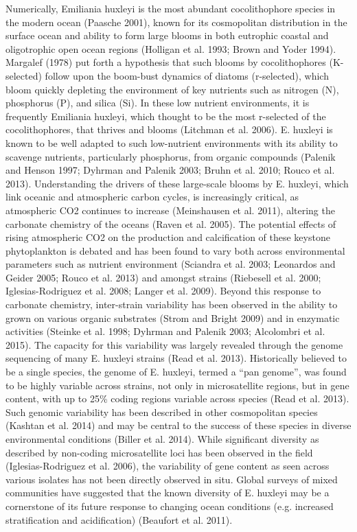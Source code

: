 Numerically, Emiliania huxleyi is the most abundant cocolithophore species in the modern ocean (Paasche 2001), known for its cosmopolitan distribution in the surface ocean and ability to form large blooms in both eutrophic coastal and oligotrophic open ocean regions (Holligan et al. 1993; Brown and Yoder 1994). Margalef (1978) put forth a hypothesis that such blooms by cocolithophores (K-selected) follow upon the boom-bust dynamics of diatoms (r-selected), which bloom quickly depleting the environment of key nutrients such as nitrogen (N), phosphorus (P), and silica (Si). In these low nutrient environments, it is frequently Emiliania huxleyi, which thought to be the most r-selected of the cocolithophores, that thrives and blooms (Litchman et al. 2006). E. huxleyi is known to be well adapted to such low-nutrient environments with its ability to scavenge nutrients, particularly phosphorus, from organic compounds (Palenik and Henson 1997; Dyhrman and Palenik 2003; Bruhn et al. 2010; Rouco et al. 2013). Understanding the drivers of these large-scale blooms by E. huxleyi, which link oceanic and atmospheric carbon cycles, is increasingly critical, as atmospheric CO2 continues to increase (Meinshausen et al. 2011), altering the carbonate chemistry of the oceans (Raven et al. 2005). 
The potential effects of rising atmospheric CO2 on the production and calcification of these keystone phytoplankton is debated and has been found to vary both across environmental parameters such as nutrient environment (Sciandra et al. 2003; Leonardos and Geider 2005; Rouco et al. 2013) and amongst strains (Riebesell et al. 2000; Iglesias-Rodriguez et al. 2008; Langer et al. 2009). Beyond this response to carbonate chemistry, inter-strain variability has been observed in the ability to grown on various organic substrates (Strom and Bright 2009) and in enzymatic activities (Steinke et al. 1998; Dyhrman and Palenik 2003; Alcolombri et al. 2015). The capacity for this variability was largely revealed through the genome sequencing of many E. huxleyi strains (Read et al. 2013). Historically believed to be a single species, the genome of E. huxleyi, termed a “pan genome”, was found to be highly variable across strains, not only in microsatellite regions, but in gene content, with up to 25\% coding regions variable across species (Read et al. 2013). Such genomic variability has been described in other cosmopolitan species (Kashtan et al. 2014) and may be central to the success of these species in diverse environmental conditions (Biller et al. 2014). While significant diversity as described by non-coding microsatellite loci has been observed in the field (Iglesias-Rodriguez et al. 2006), the variability of gene content as seen across various isolates has not been directly observed in situ. Global surveys of mixed communities have suggested that the known diversity of E. huxleyi may be a cornerstone of its future response to changing ocean conditions (e.g. increased stratification and acidification) (Beaufort et al. 2011).

